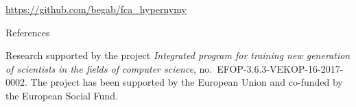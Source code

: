 \documentclass{beamer}
\newlength{\onecolwid}
\begin{document}
\begin{frame}[t]
\begin{columns}[t]
\begin{column}{\onecolwid}
  \begin{alertblock}{} \url{https://github.com/begab/fca_hypernymy} \end{alertblock} 

  \begin{block}{References}
    \scriptsize
    
    
  \end{block}

    \begin{block}{}
        {\footnotesize Research supported by the project \emph{Integrated
        program for training new generation of scientists in the fields of computer
        science}, no.~EFOP-3.6.3-VEKOP-16-2017-0002. The project has been supported
        by the European Union and co-funded by the European Social Fund.}
  \end{block}
\end{column} \end{columns} \end{frame}
\end{document}
